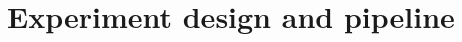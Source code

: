 \renewcommand{\sectioninfo}{Presenters: T3 (4 min), T2 (2 min), T1 (4 min)}
\section{Experiment design and pipeline}

